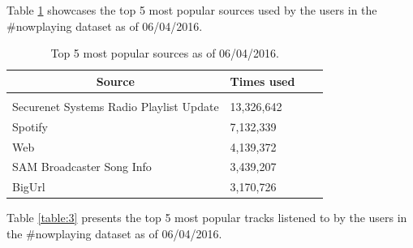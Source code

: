 \documentclass{article} %
\begin{document}
Table \ref{table:2} showcases the top 5 most popular sources used by the users in the \#nowplaying dataset as of 06/04/2016.

\begin{table}[ht]
\caption{Top 5 most popular sources as of 06/04/2016.}
\label{table:2}
\begin{center}
\begin{tabular}{l l l l}
\multicolumn{1}{c}{\bf Source} & \multicolumn{1}{c}{\bf Times used}
\\ \hline \\
Securenet Systems Radio Playlist Update & 13,326,642\\
Spotify                                 & 7,132,339\\
Web                                     & 4,139,372\\
SAM Broadcaster Song Info               & 3,439,207\\
BigUrl                                  & 3,170,726\\
\end{tabular}
\end{center}
\end{table}

Table \ref{table:3} presents the top 5 most popular tracks listened to by the users in the \#nowplaying dataset as of 06/04/2016.
\end{document}
